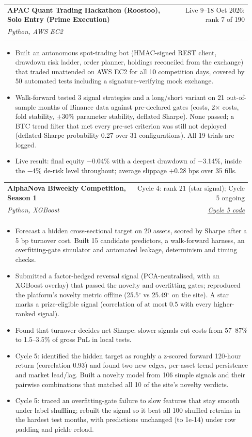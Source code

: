 \documentclass[letterpaper,10pt]{article}
\makeatletter
\newcommand{\entry}[4]{%
  \vspace{2pt}
  \begin{tabularx}{\linewidth}{@{}X@{\hspace{6pt}}r@{}}
    \textbf{#1} & #2 \\
    \if\relax\detokenize{#3}\relax\else \textit{\small #3} & \textit{\small #4} \\ \fi
  \end{tabularx}\vspace{-3pt}
}
\makeatother
\begin{document}
\entry{APAC Quant Trading Hackathon (Roostoo), Solo Entry (Prime Execution)}{Live 9--18 Oct 2026: rank 7 of 190}
      {Python, AWS EC2}{}
\begin{itemize}
  \item Built an autonomous spot-trading bot (HMAC-signed REST client, drawdown risk ladder, order planner, holdings
        reconciled from the exchange) that traded unattended on AWS EC2 for all 10 competition days, covered by 50
        automated tests including a signature-verifying mock exchange.
  \item Walk-forward tested 3 signal strategies and a long/short variant on 21 out-of-sample months of Binance data
        against pre-declared gates (costs, 2$\times$ costs, fold stability, $\pm$30\% parameter stability, deflated Sharpe). None
        passed; a BTC trend filter that met every pre-set criterion was still not deployed (deflated-Sharpe probability 0.27
        over 31 configurations). All 19 trials are logged.
  \item Live result: final equity $-$0.04\% with a deepest drawdown of $-$3.14\%, inside the $-$4\% de-risk level throughout;
        average slippage +0.28 bps over 35 fills.
\end{itemize}

\entry{AlphaNova Biweekly Competition, Season 1}{Cycle 4: rank 21 (star signal); Cycle 5 ongoing}
      {Python, XGBoost}{\href{https://github.com/Lnvqntx/Alpha_Nova_S1_C5}{\underline{Cycle 5 code}}}
\begin{itemize}
  \item Forecast a hidden cross-sectional target on 20 assets, scored by Sharpe after a 5 bp turnover cost. Built 15
        candidate predictors, a walk-forward harness, an overfitting-gate simulator and automated leakage, determinism
        and timing checks.
  \item Submitted a factor-hedged reversal signal (PCA-neutralised, with an XGBoost overlay) that passed the novelty and
        overfitting gates; reproduced the platform's novelty metric offline (25.5$^\circ$ vs 25.49$^\circ$ on the site). A star marks a
        prize-eligible signal (correlation of at most 0.5 with every higher-ranked signal).
  \item Found that turnover decides net Sharpe: slower signals cut costs from 57--87\% to 1.5--3.5\% of gross PnL in local
        tests.
  \item Cycle 5: identified the hidden target as roughly a z-scored forward 120-hour return (correlation 0.93) and found two
        new edges, per-asset trend persistence and market lead/lag. Built a novelty model from 106 simple signals and
        their pairwise combinations that matched all 10 of the site's novelty verdicts.
  \item Cycle 5: traced an overfitting-gate failure to slow features that stay smooth under label shuffling; rebuilt the signal
        so it beat all 100 shuffled retrains in the hardest test months, with predictions unchanged (to 1e-14) under row
        padding and pickle reload.
\end{itemize}
\end{document}
